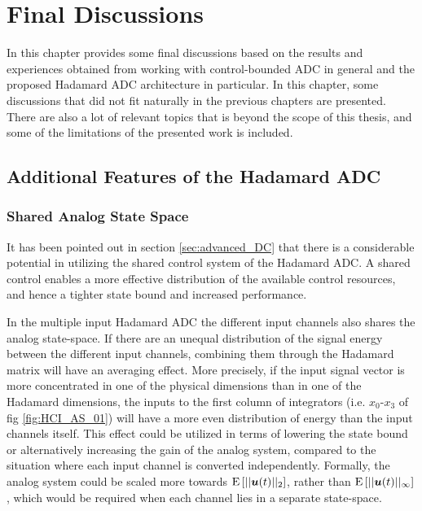 
\chapter{Final Discussions}
\label{sec:final_discussion}

In this chapter provides some final discussions based on the results and experiences obtained from working with control-bounded ADC in general and the proposed Hadamard ADC architecture in particular. In this chapter, some discussions that did not fit naturally in the previous chapters are presented. There are also a lot of relevant topics that is beyond the scope of this thesis, and some of the limitations of the presented work is included.

\section{Additional Features of the Hadamard ADC}
\subsection{Shared Analog State Space}
It has been pointed out in section \ref{sec:advanced_DC} that there is a considerable potential in utilizing the shared control system of the Hadamard ADC. A shared control enables a more effective distribution of the available control resources, and hence a tighter state bound and increased performance.

In the multiple input Hadamard ADC the different input channels also shares the analog state-space. If there are an unequal distribution of the signal energy between the different input channels, combining them through the Hadamard matrix will have an averaging effect. More precisely, if the input signal vector is more concentrated in one of the physical dimensions than in one of the Hadamard dimensions, the inputs to the first column of integrators (i.e. $x_0$-$x_3$ of fig \ref{fig:HCI_AS_01}) will have a more even distribution of energy than the input channels itself. This effect could be utilized in terms of lowering the state bound or alternatively increasing the gain of the analog system, compared to the situation where each input channel is converted independently. Formally, the analog system could be scaled more towards $\text{E}\left[ ||\bm{u}(t)||_{2} \right]$, rather than $\text{E} \left[ ||\bm{u}(t)||_{\infty} \right]$, which would be required when each channel lies in a separate state-space.

